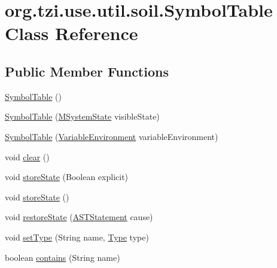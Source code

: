 \hypertarget{classorg_1_1tzi_1_1use_1_1util_1_1soil_1_1_symbol_table}{\section{org.\-tzi.\-use.\-util.\-soil.\-Symbol\-Table Class Reference}
\label{classorg_1_1tzi_1_1use_1_1util_1_1soil_1_1_symbol_table}
}
\subsection*{Public Member Functions}
\begin{DoxyCompactItemize}
\item 
\hyperlink{classorg_1_1tzi_1_1use_1_1util_1_1soil_1_1_symbol_table_a70238f266e60dd99648829ae09a39e24}{Symbol\-Table} ()
\item 
\hyperlink{classorg_1_1tzi_1_1use_1_1util_1_1soil_1_1_symbol_table_a13f24cf110db886be0aa4f649bb3bf98}{Symbol\-Table} (\hyperlink{classorg_1_1tzi_1_1use_1_1uml_1_1sys_1_1_m_system_state}{M\-System\-State} visible\-State)
\item 
\hyperlink{classorg_1_1tzi_1_1use_1_1util_1_1soil_1_1_symbol_table_aedfa361e6c5226157485ef0bf3f248f3}{Symbol\-Table} (\hyperlink{classorg_1_1tzi_1_1use_1_1util_1_1soil_1_1_variable_environment}{Variable\-Environment} variable\-Environment)
\item 
void \hyperlink{classorg_1_1tzi_1_1use_1_1util_1_1soil_1_1_symbol_table_ad140b4aa84701d860bfa6e7e0eb8f429}{clear} ()
\item 
void \hyperlink{classorg_1_1tzi_1_1use_1_1util_1_1soil_1_1_symbol_table_ab0f4e7ecb6444c05827d99d519f99ea4}{store\-State} (Boolean explicit)
\item 
void \hyperlink{classorg_1_1tzi_1_1use_1_1util_1_1soil_1_1_symbol_table_a6d0403a85dae5f0a9c14839335eaa347}{store\-State} ()
\item 
void \hyperlink{classorg_1_1tzi_1_1use_1_1util_1_1soil_1_1_symbol_table_a7ca26631ba443dd3b8d87710b24e351a}{restore\-State} (\hyperlink{classorg_1_1tzi_1_1use_1_1parser_1_1soil_1_1ast_1_1_a_s_t_statement}{A\-S\-T\-Statement} cause)
\item 
void \hyperlink{classorg_1_1tzi_1_1use_1_1util_1_1soil_1_1_symbol_table_afbc64998f7170823b9bf45fd2a790149}{set\-Type} (String name, \hyperlink{interfaceorg_1_1tzi_1_1use_1_1uml_1_1ocl_1_1type_1_1_type}{Type} type)
\item 
boolean \hyperlink{classorg_1_1tzi_1_1use_1_1util_1_1soil_1_1_symbol_table_aca29076c20a7a76ab87879fdfc36db88}{contains} (String name)

\end{DoxyCompactItemize}
